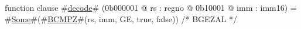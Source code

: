 function clause #\hyperref[zdecode]{decode}# (0b000001 @ rs : regno @ 0b10001 @ imm : imm16) =
  #\hyperref[zSome]{Some}#(#\hyperref[zBCMPZ]{BCMPZ}#(rs, imm, GE, true, false))  /* BGEZAL */
